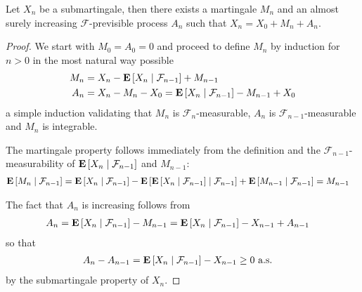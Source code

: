 \begin{lem}\label{DoobDecompositionDiscrete}Let
  $X_n$ be a submartingale, then there exists a martingale $M_n$ and
  an almost surely increasing $\mathcal{F}$-previsible process $A_n$ such that $X_n
  = X_0 + M_n + A_n$.
\end{lem}
\begin{proof}
We start with $M_0 = A_0 = 0$ and proceed to define $M_n$ by induction
for $n >0$ in the most natural way possible
\begin{align*}
M_n &= X_n - \cexpectationlong{\mathcal{F}_{n-1}}{X_n} + M_{n-1} \\
A_n &= X_n - M_n - X_0 = \cexpectationlong{\mathcal{F}_{n-1}}{X_n} - M_{n-1}
+ X_0
\end{align*}
a simple induction validating that $M_n$ is
$\mathcal{F}_n$-measurable, $A_n$ is $\mathcal{F}_{n-1}$-measurable
and $M_n$ is integrable.

The martingale property follows immediately from the definition and
the $\mathcal{F}_{n-1}$-measurability of
$\cexpectationlong{\mathcal{F}_{n-1}}{X_n}$ and $M_{n-1}$:
\begin{align*}
\cexpectationlong{\mathcal{F}_{n-1}}{M_n} &=
\cexpectationlong{\mathcal{F}_{n-1}}{X_n} -
\cexpectationlong{\mathcal{F}_{n-1}}{\cexpectationlong{\mathcal{F}_{n-1}} {X_n}} + 
\cexpectationlong{\mathcal{F}_{n-1}}{M_{n-1}} =M_{n-1}
\end{align*}

The fact that $A_n$ is increasing follows from
\begin{align*}
A_n &= \cexpectationlong{\mathcal{F}_{n-1}}{X_n} - M_{n-1} =
\cexpectationlong{\mathcal{F}_{n-1}}{X_n} - X_{n-1} + A_{n-1}
\end{align*}
so that 
\begin{align*}
A_n - A_{n-1} &= \cexpectationlong{\mathcal{F}_{n-1}}{X_n} - X_{n-1}
\geq 0 \text{ a.s.}
\end{align*}
by the submartingale property of $X_n$.
\end{proof}

